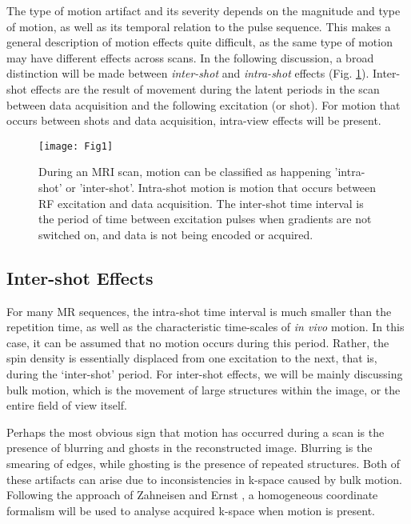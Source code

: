 \documentclass[class=article, crop=false]{standalone}
\begin{document}
The type of motion artifact and its severity depends on the magnitude and type of motion, as well as its temporal relation to the pulse sequence. This makes a general description of motion effects quite difficult, as the same type of motion may have different effects across scans. In the following discussion, a broad distinction will be made between \textit{inter-shot} and \textit{intra-shot} effects (Fig. \ref{fig:fig1}). Inter-shot effects are the result of movement during the latent periods in the scan between data acquisition and the following excitation (or shot). For motion that occurs between shots and data acquisition, intra-view effects will be present.

\begin{figure}[h]
	\texttt{[image: Fig1]}
	\centering
	\caption{During an MRI scan, motion can be classified as happening 'intra-shot' or 'inter-shot'. Intra-shot motion is motion that occurs between RF excitation and data acquisition. The inter-shot time interval is the period of time between excitation pulses when gradients are not switched on, and data is not being encoded or acquired.}
	\label{fig:fig1}
\end{figure}

\subsection{Inter-shot Effects}

For many MR sequences, the intra-shot time interval is much smaller than the repetition time, as well as the characteristic time-scales of \textit{in vivo} motion. In this case, it can be assumed that no motion occurs during this period. Rather, the spin density is essentially displaced from one excitation to the next, that is, during the `inter-shot' period. For inter-shot effects, we will be mainly discussing bulk motion, which is the movement of large structures within the image, or the entire field of view itself. 
\par
Perhaps the most obvious sign that motion has occurred during a scan is the presence of blurring and ghosts in the reconstructed image. Blurring is the smearing of edges, while ghosting is the presence of repeated structures. Both of these artifacts can arise due to inconsistencies in k-space caused by bulk motion. Following the approach of Zahneisen and Ernst \parencite*{Zahneisen2016}, a homogeneous coordinate formalism will be used to analyse acquired k-space when motion is present.
\end{document}
